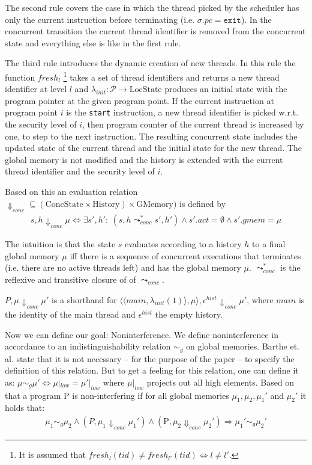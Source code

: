 \documentclass[a4paper,10pt]{llncs}
\begin{document}
The second rule covers the case in which the thread picked by the scheduler has only the current
instruction before terminating (i.e. $\sigma.pc = \mathtt{exit}$). In the concurrent transition
the current thread identifier is removed from the concurrent state and everything else is like in the
first rule.

The third rule introduces the dynamic creation of new threads. In this rule the function $fresh_{l}$
\footnote{It is assumed that $fresh_l(tid) \neq fresh_{l'}(tid) \Leftrightarrow l \neq l'$.}
takes a set of thread identifiers and returns a new thread identifier at level $l$ and $\lambda_{init} : \mathcal{P}
\rightarrow \text{LocState}$ produces an initial state with the program pointer at the given program point.
If the current instruction at program point $i$ is the \texttt{start} instruction, a new thread
identifier is picked w.r.t. the security level of $i$, then program counter of the current thread
is increased by one, to step to the next instruction. The resulting concurrent state includes the
updated state of the current thread and the initial state for the new thread. The global memory
is not modified and the history is extended with the current thread identifier and the security level of $i$.

Based on this an evaluation relation $\Downarrow_{conc} \subseteq (\text{ConcState} \times \text{History}) \times
\text{GMemory})$ is defined by
\begin{align*}
s, h \Downarrow_{conc} \mu \Leftrightarrow \exists s', h':\ (s,h \leadsto_{conc}^* s',h') \land s'.act = \emptyset \land s'.gmem = \mu
\end{align*}

The intuition is that the state $s$ evaluates according to a history $h$ to a final global memory $\mu$ iff there is a
sequence of concurrent executions that terminates (i.e. there are no active threads left) and has the
global memory $\mu$. $\leadsto_{conc}^*$ is the reflexive and transitive closure of of $\leadsto_{conc}$.

$P, \mu \Downarrow_{conc} \mu'$ is a shorthand for $\langle\langle main,\lambda_{init}(1)\rangle,
\mu\rangle, \epsilon^{hist} \Downarrow_{conc} \mu'$, where $main$ is the identity of the main thread
and $\epsilon^{hist}$ the empty history.

Now we can define our goal: Noninterference. We define noninterference
in accordance to an indistinguishability relation $\sim_g$ on global memories.
Barthe et. al. state that it is not necessary -- for the purpose of the paper --
to specify the definition of this relation. But to get a feeling for this
relation, one can define it as: $\mu \sim_g \mu' \Leftrightarrow \mu|_{low} =
\mu'|_{low}$ where $\mu|_{low}$ projects out all high elements. Based on that
a program P is non-interfering if for all global memories $\mu_1, \mu_2, \mu_1'$
and $\mu_2'$ it holds that:
\begin{align*}
\mu_1 \sim_g \mu_2 \land (P,\mu_1 \Downarrow_{conc} \mu_1') \land (\text{P},\mu_2 \Downarrow_{conc} \mu_2') \Rightarrow \mu_1' \sim_g \mu_2'
\end{align*}
\end{document}
